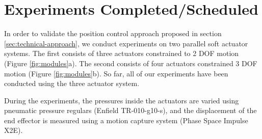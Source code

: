 \section{Experiments Completed/Scheduled}   \label{sec:experiments}

In order to validate the position control approach proposed in section \ref{sec:technical-approach}, we conduct experiments on two parallel soft actuator systems. The first consists of three actuators constrained to 2 DOF motion (Figure \ref{fig:modules}a). The second consists of four actuators constrained 3 DOF motion (Figure \ref{fig:modules}b). 
    So far, all of our experiments have been conducted using the three actuator system.

During the experiments, the pressures inside the actuators are varied using pneumatic pressure regulars (Enfield TR-010-g10-s), and the displacement of the end effector is measured using a motion capture system (Phase Space Impulse X2E).

